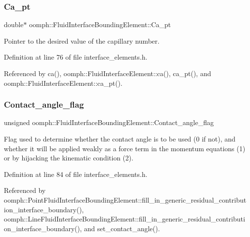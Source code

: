 \subsubsection{\texorpdfstring{Ca\+\_\+pt}{Ca\_pt}}
{\footnotesize\ttfamily double$\ast$ oomph\+::\+Fluid\+Interface\+Bounding\+Element\+::\+Ca\+\_\+pt\hspace{0.3cm}{\ttfamily [private]}}



Pointer to the desired value of the capillary number. 



Definition at line 76 of file interface\+\_\+elements.\+h.



Referenced by ca(), oomph\+::\+Fluid\+Interface\+Element\+::ca(), ca\+\_\+pt(), and oomph\+::\+Fluid\+Interface\+Element\+::ca\+\_\+pt().

\mbox{\label{classoomph_1_1FluidInterfaceBoundingElement_affa8d787e58ca23c2e73b4c8a2c30766}} 
\subsubsection{\texorpdfstring{Contact\+\_\+angle\+\_\+flag}{Contact\_angle\_flag}}
{\footnotesize\ttfamily unsigned oomph\+::\+Fluid\+Interface\+Bounding\+Element\+::\+Contact\+\_\+angle\+\_\+flag\hspace{0.3cm}{\ttfamily [protected]}}



Flag used to determine whether the contact angle is to be used (0 if not), and whether it will be applied weakly as a force term in the momentum equations (1) or by hijacking the kinematic condition (2). 



Definition at line 84 of file interface\+\_\+elements.\+h.



Referenced by oomph\+::\+Point\+Fluid\+Interface\+Bounding\+Element\+::fill\+\_\+in\+\_\+generic\+\_\+residual\+\_\+contribution\+\_\+interface\+\_\+boundary(), oomph\+::\+Line\+Fluid\+Interface\+Bounding\+Element\+::fill\+\_\+in\+\_\+generic\+\_\+residual\+\_\+contribution\+\_\+interface\+\_\+boundary(), and set\+\_\+contact\+\_\+angle().

